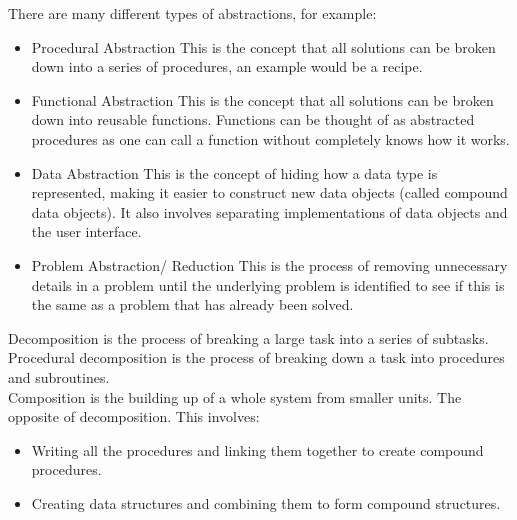   There are many different types of abstractions, for example:
  \begin{itemize}
    \setlength{\itemsep}{0em}
    \item {}Procedural Abstraction
    \subitem This is the concept that all solutions can be broken down into a series of procedures, an example would be a recipe.
    \item {}Functional Abstraction
    \subitem This is the concept that all solutions can be broken down into reusable functions. Functions can be thought of as abstracted procedures as one can call a function without completely knows how it works.
    \item {}Data Abstraction
    \subitem This is the concept of hiding how a data type is represented, making it easier to construct new data objects (called compound data objects). It also involves separating implementations of data objects and the user interface.
    \item {}Problem Abstraction/ Reduction
    \subitem This is the process of removing unnecessary details in a problem until the underlying problem is identified to see if this is the same as a problem that has already been solved.
  \end{itemize}
  Decomposition is the process of breaking a large task into a series of subtasks. Procedural decomposition is the process of breaking down a task into procedures and subroutines.\\
  Composition is the building up of a whole system from smaller units. The opposite of decomposition. This involves:
  \begin{itemize}
    \setlength{\itemsep}{0em}
    \item Writing all the procedures and linking them together to create compound procedures.
    \item Creating data structures and combining them to form compound structures.
  \end{itemize}
